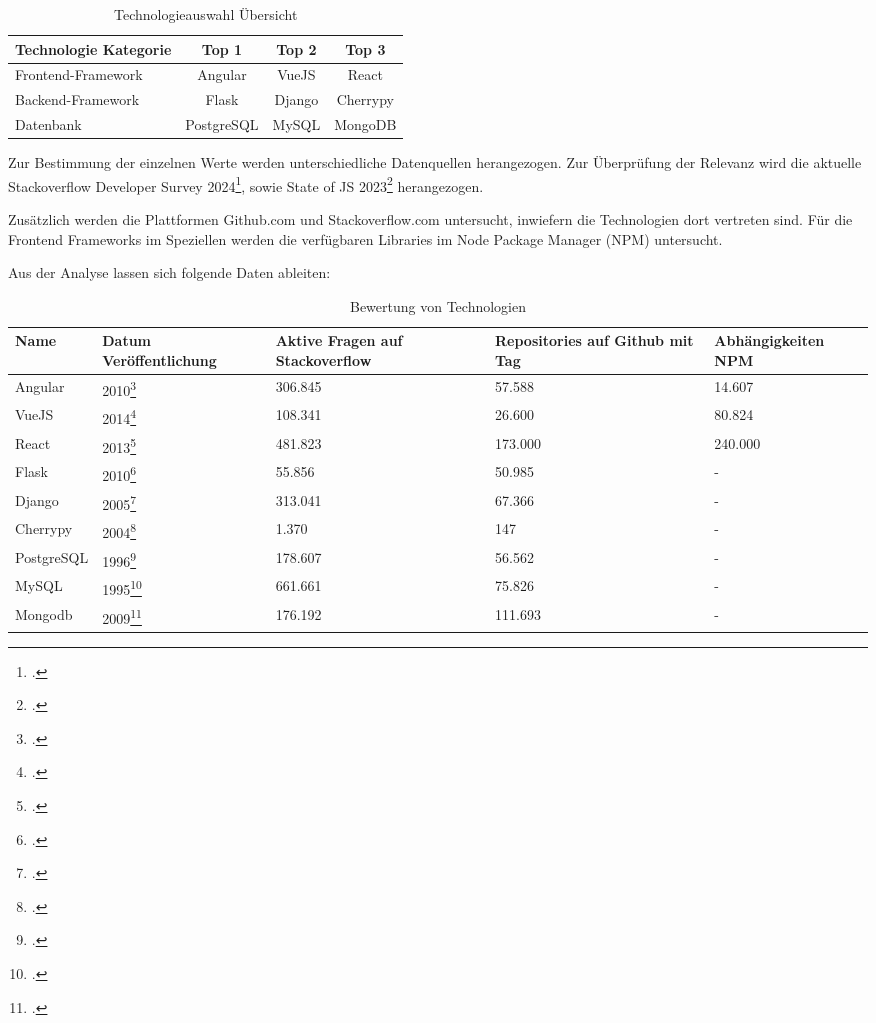 \begin{table}[htbp]
  \centering
  \begin{tabular}{|l|c|c|c|}
      \hline
      \textbf{Technologie Kategorie} & \textbf{Top 1} & \textbf{Top 2} & \textbf{Top 3} \\ \hline
      {Frontend-Framework} & Angular & VueJS & React \\ \hline
      {Backend-Framework} & Flask & Django & Cherrypy \\ \hline
      {Datenbank} & PostgreSQL & MySQL & MongoDB \\ \hline
  \end{tabular}
  \caption{Technologieauswahl Übersicht}\label{tab:Technologieauswahl Übersicht}
\end{table}

Zur Bestimmung der einzelnen Werte werden unterschiedliche Datenquellen herangezogen.
Zur Überprüfung der Relevanz wird die aktuelle Stackoverflow Developer Survey 2024\footcite{StackOverflow2024}, sowie State of JS 2023\footcite{stateofjsStateJavaScript2023} herangezogen.

Zusätzlich werden die Plattformen Github.com und Stackoverflow.com untersucht, inwiefern die Technologien dort vertreten sind.
Für die Frontend Frameworks im Speziellen werden die verfügbaren Libraries im Node Package Manager (NPM) untersucht.

Aus der Analyse lassen sich folgende Daten ableiten:

\begin{table}[h!]
    \centering
    \begin{tabular}{|l|p{2cm}|p{3cm}|p{3cm}|p{3cm}|}
        \hline
        \rowcolor{lightgray} Name & \textbf{Datum Veröffentlichung} & \textbf{Aktive Fragen auf Stackoverflow} & \textbf{Repositories auf Github mit Tag} & \textbf{Abhängigkeiten NPM} \\ \hline
        Angular & 2010\footcite{githubAngularReleaseV090} & 306.845 & 57.588 & 14.607 \\ \hline
        VueJS & 2014\footcite{eggheadEvanYou} & 108.341 & 26.600 & 80.824 \\ \hline
        React & 2013\footcite{githubReactCHANGELOG} & 481.823 & 173.000 & 240.000 \\ \hline
        \hline
        Flask & 2010\footcite{pypiFlask} & 55.856 & 50.985 & - \\ \hline
        Django & 2005\footcite{pypiDjango} & 313.041 & 67.366 & - \\ \hline
        Cherrypy & 2004\footcite{pypiCherryPy} & 1.370 & 147 & - \\ \hline
        \hline
        PostgreSQL & 1996\footcite{postgresqlHappyBirthday} & 178.607 & 56.562 & - \\ \hline
        MySQL & 1995\footcite{amazonWhatMySQL} & 661.661 & 75.826 & - \\ \hline
        Mongodb & 2009\footcite{mongodbMongoDBEvolved} & 176.192 & 111.693 & - \\ \hline
    \end{tabular}
    \caption{Bewertung von Technologien}\label{tab:Analyseergebnise Relevanz der Plattformen}
\end{table}

